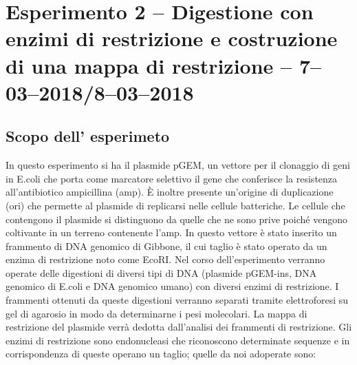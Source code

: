 \documentclass[twocolumn,a4paper,10pt]{my_report}
\begin{document}
\section{Esperimento 2 -- Digestione con enzimi di restrizione e costruzione di una mappa di restrizione -- 7--03--2018/8--03--2018}

\subsection{Scopo dell' esperimeto}
In questo esperimento si ha il plasmide pGEM, un vettore per il clonaggio di geni in E.coli che porta come marcatore selettivo il gene che conferisce la resistenza all’antibiotico ampicillina (amp).
È inoltre presente un’origine di duplicazione (ori) che permette al plasmide di replicarsi nelle cellule batteriche.
Le cellule che contengono il plasmide si distinguono da quelle che ne sono prive poiché vengono coltivante in un terreno contenente l’amp.
In questo vettore è stato inserito un frammento di DNA genomico di Gibbone, il cui taglio è stato operato da un enzima di restrizione noto come EcoRI.
Nel corso dell’esperimento verranno operate delle digestioni di diversi tipi di DNA (plasmide pGEM-ins, DNA genomico di E.coli e DNA genomico umano) con diversi enzimi di restrizione.
I frammenti ottenuti da queste digestioni verranno separati tramite elettroforesi su gel di agarosio in modo da determinarne i pesi molecolari.
La mappa di restrizione del plasmide verrà dedotta dall’analisi dei frammenti di restrizione.
Gli enzimi di restrizione sono endonucleasi che riconoscono determinate sequenze e in corrispondenza di queste operano un taglio; quelle da noi adoperate sono:
\end{document}
